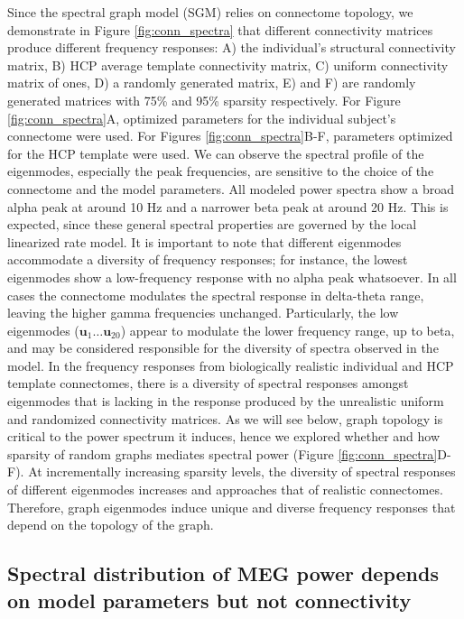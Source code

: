 Since the spectral graph model (SGM) relies on connectome topology, we
demonstrate in Figure \ref{fig:conn_spectra} that different connectivity matrices
produce different frequency responses: A) the individual's structural
connectivity matrix, B) HCP average template connectivity matrix, C)
uniform connectivity matrix of ones, D) a randomly generated matrix, E)
and F) are randomly generated matrices with 75\% and 95\% sparsity
respectively. For Figure \ref{fig:conn_spectra}A, optimized parameters for the individual
subject's connectome were used. For Figures \ref{fig:conn_spectra}B-F, parameters optimized
for the HCP template were used. We can observe the spectral profile of
the eigenmodes, especially the peak frequencies, are sensitive to the
choice of the connectome and the model parameters. All modeled power
spectra show a broad alpha peak at around 10 Hz and a narrower beta peak
at around 20 Hz. This is expected, since these general spectral
properties are governed by the local linearized rate model. It is
important to note that different eigenmodes accommodate a diversity of
frequency responses; for instance, the lowest eigenmodes show a
low-frequency response with no alpha peak whatsoever. In all cases the connectome modulates the spectral response in delta-theta range, leaving the higher gamma frequencies unchanged. Particularly, the low eigenmodes ($\mathbf{u}_1 \ldots \mathbf{u}_{20}$) appear to modulate the lower frequency range, up to beta, and may be considered responsible for the diversity of spectra observed in the model. In the frequency
responses from biologically realistic individual and HCP template
connectomes, there is a diversity of spectral responses amongst
eigenmodes that is lacking in the response produced by the unrealistic
uniform and randomized connectivity matrices. As we will see below, graph topology is
critical to the power spectrum it induces, hence we explored whether and
how sparsity of random graphs mediates spectral power (Figure \ref{fig:conn_spectra}D-F). At incrementally increasing sparsity levels, the diversity of
spectral responses of different eigenmodes increases and approaches that
of realistic connectomes. Therefore, graph eigenmodes induce unique and
diverse frequency responses that depend on the topology of the graph.

\subsection{Spectral distribution of MEG power depends on model parameters but not
connectivity}


